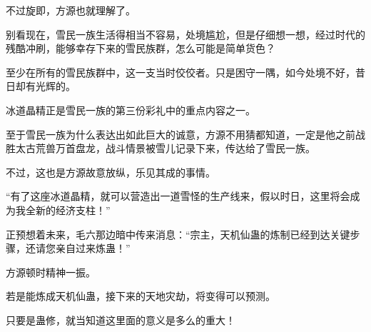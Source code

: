 \begin{this_body}
不过旋即，方源也就理解了。

别看现在，雪民一族生活得相当不容易，处境尴尬，但是仔细想一想，经过时代的残酷冲刷，能够幸存下来的雪民族群，怎么可能是简单货色？

至少在所有的雪民族群中，这一支当时佼佼者。只是困守一隅，如今处境不好，昔日却有光辉的。

冰道晶精正是雪民一族的第三份彩礼中的重点内容之一。

至于雪民一族为什么表达出如此巨大的诚意，方源不用猜都知道，一定是他之前战胜太古荒兽万首盘龙，战斗情景被雪儿记录下来，传达给了雪民一族。

不过，这也是方源故意放纵，乐见其成的事情。

“有了这座冰道晶精，就可以营造出一道雪怪的生产线来，假以时日，这里将会成为我全新的经济支柱！”

正预想着未来，毛六那边暗中传来消息：“宗主，天机仙蛊的炼制已经到达关键步骤，还请您亲自过来炼蛊！”

方源顿时精神一振。

若是能炼成天机仙蛊，接下来的天地灾劫，将变得可以预测。

只要是蛊修，就当知道这里面的意义是多么的重大！

\end{this_body}

